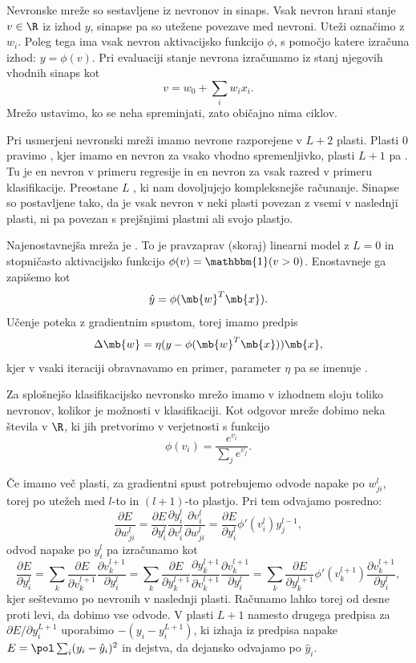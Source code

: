 
Nevronske mreže so sestavljene iz nevronov in sinaps.
Vsak nevron hrani stanje $v \in \R$ iz izhod $y$, sinapse pa so utežene povezave
med nevroni.
Uteži označimo z $w_i$.
Poleg tega ima vsak nevron aktivacijsko funkcijo $\phi$, s pomočjo katere
izračuna izhod: $y = \phi(v)$.
Pri evaluaciji stanje nevrona izračunamo iz stanj njegovih vhodnih sinaps kot
\[
  v = w_0 + \sum_i w_i x_i.
\]
Mrežo ustavimo, ko se neha spreminjati, zato običajno nima ciklov.

Pri usmerjeni nevronski mreži imamo nevrone razporejene v $L+2$ plasti.
Plasti $0$ pravimo , kjer imamo en nevron za vsako vhodno
spremenljivko, plasti $L+1$ pa .
Tu je en nevron v primeru regresije in en nevron za vsak razred v primeru
klasifikacije.
Preostane $L$ , ki nam dovoljujejo kompleksnejše
računanje.
Sinapse so postavljene tako, da je vsak nevron v neki plasti povezan z vsemi v
naslednji plasti, ni pa povezan s prejšnjimi plastmi ali svojo plastjo.


Najenostavnejša mreža je .
To je pravzaprav (skoraj) linearni model z $L = 0$ in stopničasto aktivacijsko
funkcijo $\phi(v) = \mathbbm{1}(v > 0)$.
Enostavneje ga zapišemo kot
\[
  \hat{y} = \phi(\mb{w}^T \mb{x}).
\]
Učenje poteka z gradientnim spustom, torej imamo predpis
\[
  \Delta \mb{w} = \eta (y - \phi(\mb{w}^T \mb{x})) \mb{x},
\]
kjer v vsaki iteraciji obravnavamo en primer, parameter $\eta$ pa se imenuje
.


Za splošnejšo klasifikacijsko nevronsko mrežo imamo v izhodnem sloju toliko
nevronov, kolikor je možnosti v klasifikaciji.
Kot odgovor mreže dobimo neka števila v $\R$, ki jih pretvorimo v verjetnosti s
funkcijo 
\[
  \phi(v_i) = \frac{e^{v_i}}{\sum_j e^{v_j}}.
\]


Če imamo več plasti, za gradientni spust potrebujemo odvode napake po
$w_{ji}^{l}$, torej po utežeh med $l$-to in $(l+1)$-to plastjo.
Pri tem odvajamo posredno:
\[
  \frac{\partial E}{\partial w_{ji}^l}
  = \frac{\partial E}{\partial y_i^l} \frac{\partial y_i^l}{\partial v_i^l}
  \frac{\partial v_i^l}{\partial w_{ji}^l}
  = \frac{\partial E}{\partial y_i^l} \phi'(v_i^l) y_j^{l-1},
\]
odvod napake po $y_i^l$ pa izračunamo kot
\[
  \frac{\partial E}{\partial y_i^l}
  = \sum_k \frac{\partial E}{\partial v_k^{l+1}} \frac{\partial
	v_k^{l+1}}{\partial y_i^l}
  = \sum_k \frac{\partial E}{\partial y_k^{l+1}} \frac{\partial
	y_k^{l+1}}{\partial v_k^{l+1}} \frac{\partial v_k^{l+1}}{\partial y_i^l}
  = \sum_k \frac{\partial E}{\partial y_k^{l+1}} \phi'(v_k^{l+1}) \frac{\partial
	v_k^{l+1}}{\partial y_i^l},
\]
kjer seštevamo po nevronih v naslednji plasti.
Računamo lahko torej od desne proti levi, da dobimo vse odvode.
V plasti $L+1$ namesto drugega predpisa za $\partial E / \partial y_i^{L+1}$
uporabimo $-(y_i - y_i^{L+1})$, ki izhaja iz predpisa napake $E = \pol \sum_i
(y_i - \hat{y}_i)^2$ in dejstva, da dejansko odvajamo po $\hat{y}_i$.

